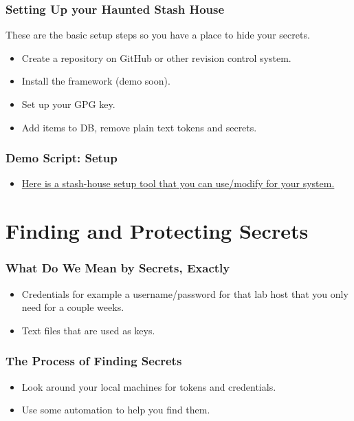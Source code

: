 \documentclass[aspectratio=169]{beamer}
\makeatletter
\def\sectionsubtitle#1{\gdef\@sectionsubtitle{#1}}
\gdef\@sectionsubtitle{}
\makeatother
\begin{document}
\begin{frame}
    \frametitle{Setting Up your Haunted Stash House}
    These are the basic setup steps so you have a place to hide your secrets.
    \begin{itemize}
        \item Create a repository on GitHub or other revision control system.
        \item Install the framework (demo soon).
        \item Set up your GPG key.
        \item Add items to DB, remove plain text tokens and secrets.
    \end{itemize}
\end{frame}

\begin{frame}
    \frametitle{Demo Script: Setup}
    \begin{itemize}
        \item \href{ https://github.com/devsecfranklin/stash-house/blob/main/bin/install-client.sh }{Here is a stash-house setup tool that you can use/modify for your system. }
    \end{itemize}
\end{frame}


\sectionsubtitle{What is it you want to protect?}
\section{Finding and Protecting Secrets}

\begin{frame}
	\frametitle{What Do We Mean by Secrets, Exactly}
	\begin{itemize}
		\item Credentials for example a username/password for that lab host that you only need for a couple weeks.
		\item Text files that are used as keys.
	\end{itemize}


\end{frame}

\begin{frame}
	\frametitle{The Process of Finding Secrets}
	\begin{itemize}
		\item Look around your local machines for tokens and credentials.
		\item Use some automation to help you find them.
	\end{itemize}
\end{frame}
\end{document}
